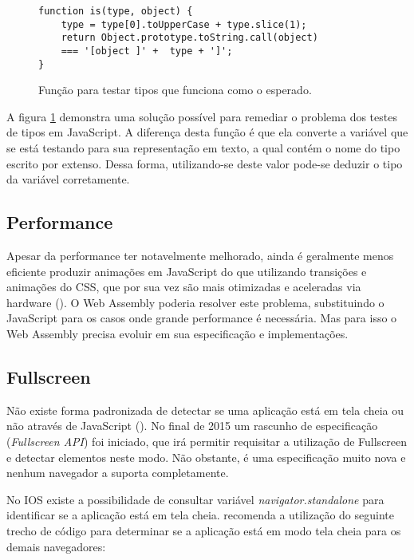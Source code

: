 \begin{figure}[H]
\centering
\begin{verbatim}
function is(type, object) {
    type = type[0].toUpperCase + type.slice(1);
    return Object.prototype.toString.call(object)
    === '[object ]' +  type + ']';
}
\end{verbatim}
\caption{Função para testar tipos que funciona como o esperado.}
\label{fig:fixJSTypes}
\end{figure}

A figura \ref{fig:fixJSTypes} demonstra uma solução possível para
remediar o problema dos testes de tipos em JavaScript. A diferença
desta função é que ela converte a variável que se está testando
para sua representação em texto, a qual contém o nome do tipo escrito
por extenso. Dessa forma, utilizando-se deste valor pode-se deduzir o
tipo da variável corretamente.

\subsection{Performance}

Apesar da performance ter notavelmente melhorado, ainda é geralmente
menos eficiente produzir animações em JavaScript do que utilizando
transições e animações do CSS, que por sua vez são mais
otimizadas e aceleradas via hardware \textsc{\autocite{html5mostwanted}}
(). O Web Assembly poderia resolver este problema,
substituindo o JavaScript para os casos onde grande performance é
necessária. Mas para isso o Web Assembly precisa evoluir em sua
especificação e implementações.

\subsection{Fullscreen}

Não existe forma padronizada de detectar se uma aplicação
está em tela cheia ou não através de JavaScript
(). No final de 2015 um rascunho de 
especificação (\textit{Fullscreen API}) foi iniciado, que irá permitir 
requisitar a utilização de Fullscreen e detectar elementos neste modo.
Não obstante, é uma especificação muito nova e nenhum navegador a suporta
completamente.

No IOS existe a possibilidade de consultar variável
\textit{navigator.standalone} para identificar se a aplicação está
em tela cheia. \citet{homescreenwebapps} recomenda a utilização do
seguinte trecho de código para determinar se a aplicação está em
modo tela cheia para os demais navegadores:

